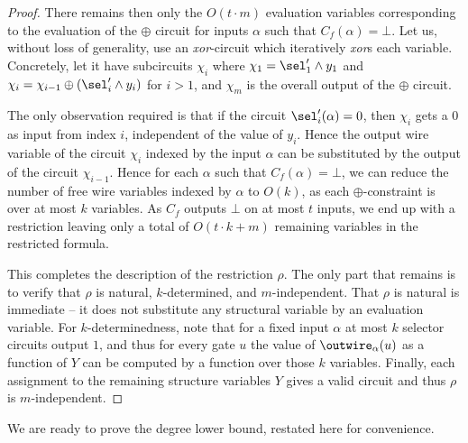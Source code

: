 \begin{proof}
  There remains then only the $O(t \cdot m)$ evaluation variables
  corresponding to the evaluation of the $\oplus$ circuit for inputs
  $\alpha$ such that $C_f(\alpha) = \bot$. Let us, without loss of
  generality, use an \emph{xor}-circuit which iteratively \emph{xor}s
  each variable.  Concretely, let it have subcircuits $\chi_i$ where
  $\chi_1 = \sel'_1 \wedge y_1$ and
  $\chi_{i} = \chi_{i-1} \oplus (\sel'_i \wedge y_i)$ for $i > 1$, and
  $\chi_m$ is the overall output of the $\oplus$ circuit.

  The only observation required is that if the circuit
  $\sel'_i(\alpha) = 0$, then $\chi_i$ gets a $0$ as input from index
  $i$, independent of the value of $y_i$. Hence the output wire
  variable of the circuit $\chi_i$ indexed by the input $\alpha$ can
  be substituted by the output of the circuit $\chi_{i-1}$. Hence for
  each $\alpha$ such that $C_f(\alpha) = \bot$, we can reduce the
  number of free wire variables indexed by $\alpha$ to $O(k)$, as each
  $\oplus$-constraint is over at most $k$ variables.  As $C_f$ outputs
  $\bot$ on at most $t$ inputs, we end up with a restriction leaving
  only a total of $O(t \cdot k + m)$ remaining variables in the
  restricted formula.

  This completes the description of the restriction $\rho$.  The only
  part that remains is to verify that $\rho$ is natural,
  $k$-determined, and $m$-independent.  That $\rho$ is natural is
  immediate -- it does not substitute any structural variable by an
  evaluation variable.  For $k$-determinedness, note that for a fixed
  input $\alpha$ at most $k$ selector circuits output $1$, and thus
  for every gate $u$ the value of $\outwire_\alpha(u)$ as a function
  of $Y$ can be computed by a function over those $k$ variables.
  Finally, each assignment to the remaining structure variables $Y$
  gives a valid circuit and thus $\rho$ is $m$-independent.
\end{proof}

We are ready to prove the degree lower bound, restated here for
convenience.

\MainDegree*

